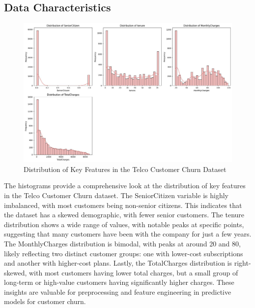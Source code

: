 \subsection{Data Characteristics}

\begin{figure}[hbt!] 
    \centering
    \includegraphics[width=1\linewidth]{Images/2.3.a.jpg}
    \caption{Distribution of Key Features in the Telco Customer Churn Dataset }
    \label{fig:enter-label}
\end{figure}

The histograms provide a comprehensive look at the distribution of key features in the Telco Customer Churn dataset. The SeniorCitizen variable is highly imbalanced, with most customers being non-senior citizens. This indicates that the dataset has a skewed demographic, with fewer senior customers. The tenure distribution shows a wide range of values, with notable peaks at specific points, suggesting that many customers have been with the company for just a few years. The MonthlyCharges distribution is bimodal, with peaks at around 20 and 80, likely reflecting two distinct customer groups: one with lower-cost subscriptions and another with higher-cost plans. Lastly, the TotalCharges distribution is right-skewed, with most customers having lower total charges, but a small group of long-term or high-value customers having significantly higher charges. These insights are valuable for preprocessing and feature engineering in predictive models for customer churn.\\

